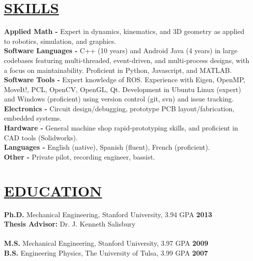 \documentclass[line,margin]{res}
\begin{document}
\begin{resume}
\section{\underline{SKILLS}}
\vspace{1.0pc}
\textbf{Applied Math -} Expert in dynamics, kinematics, and 3D geometry as applied to robotics, simulation, and graphics.
\\[0.0pc]\textbf{Software Languages -} C++ (10 years) and Android Java (4 years) in large codebases featuring multi-threaded, event-driven, and multi-process designs, with a focus on maintainability. Proficient in Python, Javascript, and MATLAB.
\\[0.0pc]\textbf{Software Tools -}
Expert knowledge of ROS. Experience with Eigen, OpenMP, MoveIt!, PCL, OpenCV, OpenGL, Qt.
Development in Ubuntu Linux (expert) and Windows (proficient)
using version control (git, svn) and issue tracking.
\\[0.0pc]\textbf{Electronics -} Circuit design/debugging, prototype PCB layout/fabrication, embedded systems.
\\[0.0pc]\textbf{Hardware -} General machine shop rapid-prototyping skills, and proficient in CAD tools (Solidworks).
\\[0.0pc]\textbf{Languages -} English (native), Spanish (fluent), French (proficient).
\\[0.0pc]\textbf{Other -} Private pilot, recording engineer, bassist.
%
%
\section{\underline{EDUCATION}}
\vspace{1.0pc}
\textbf{Ph.D.} Mechanical Engineering, Stanford University, 3.94 GPA
\hfill \textbf{2013}%
{ {\small
\\[0.0pc]{\bf Thesis Advisor:} Dr. J. Kenneth Salisbury
\\[-0.6pc]} }
%
\\[0.0pc]\textbf{M.S.} Mechanical Engineering, Stanford University, 3.97 GPA \hfill  \textbf{2009}
\\[0.0pc]\textbf{B.S.} Engineering Physics, The University of Tulsa, 3.99 GPA \hfill \textbf{2007}
%


\end{resume}
\end{document}
